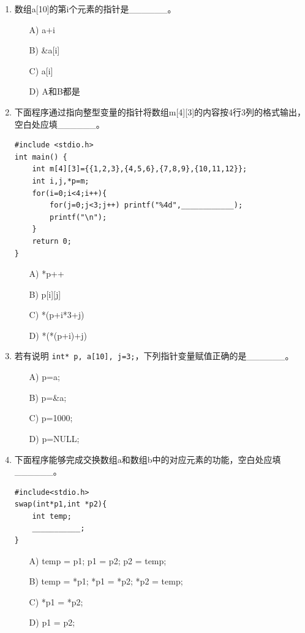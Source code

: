 \documentclass[a4paper,12pt]{article}
\begin{document}
\begin{enumerate}
	\item 数组a[10]的第i个元素的指针是\_\_\_\_\_\_。
	      \begin{enumerate}
		      \item[A)] a+i
		      \item[B)] \&a[i]
		      \item[C)] a[i]
		      \item[D)] A和B都是
	      \end{enumerate}
	      \vspace{0.3cm}

	\item 下面程序通过指向整型变量的指针将数组m[4][3]的内容按4行3列的格式输出，空白处应填\_\_\_\_\_\_。
	      \begin{verbatim}
#include <stdio.h>
int main() {
    int m[4][3]={{1,2,3},{4,5,6},{7,8,9},{10,11,12}};
    int i,j,*p=m;
    for(i=0;i<4;i++){
        for(j=0;j<3;j++) printf("%4d",____________);
        printf("\n");
    }
    return 0;
}
    \end{verbatim}
	      \begin{enumerate}
		      \item[A)] *p++
		      \item[B)] p[i][j]
		      \item[C)] *(p+i*3+j)
		      \item[D)] *(*(p+i)+j)
	      \end{enumerate}
	      \vspace{0.3cm}

	\item 若有说明 \texttt{int* p, a[10], j=3;}，下列指针变量赋值正确的是\_\_\_\_\_\_。
	      \begin{enumerate}
		      \item[A)] p=a;
		      \item[B)] p=\&a;
		      \item[C)] p=1000;
		      \item[D)] p=NULL;
	      \end{enumerate}
	      \vspace{0.3cm}

	\item 下面程序能够完成交换数组a和数组b中的对应元素的功能，空白处应填\_\_\_\_\_\_。
	      \begin{verbatim}
#include<stdio.h>
swap(int*p1,int *p2){
    int temp;
    ___________;
}
    \end{verbatim}
	      \begin{enumerate}
		      \item[A)] temp = p1; p1 = p2; p2 = temp;
		      \item[B)] temp = *p1; *p1 = *p2; *p2 = temp;
		      \item[C)] *p1 = *p2;
		      \item[D)] p1 = p2;
	      \end{enumerate}
	      \vspace{0.3cm}


\end{enumerate}
\end{document}
